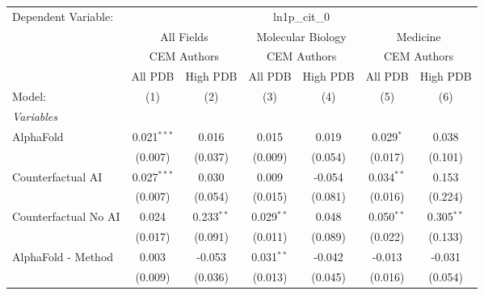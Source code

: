 \begingroup
\centering
\begin{tabular}{lcccccc}
   \tabularnewline \midrule \midrule
   Dependent Variable: & \multicolumn{6}{c}{ln1p\_cit\_0}\\
 & \multicolumn{2}{c}{All Fields} & \multicolumn{2}{c}{Molecular Biology} & \multicolumn{2}{c}{Medicine} \\
\cmidrule(lr){2-3} \cmidrule(lr){4-5} \cmidrule(lr){6-7}
 & \multicolumn{2}{c}{CEM Authors} & \multicolumn{2}{c}{CEM Authors} & \multicolumn{2}{c}{CEM Authors} \\
\cmidrule(lr){2-3} \cmidrule(lr){4-5} \cmidrule(lr){6-7}
 & \multicolumn{1}{c}{All PDB} & \multicolumn{1}{c}{High PDB} & \multicolumn{1}{c}{All PDB} & \multicolumn{1}{c}{High PDB} & \multicolumn{1}{c}{All PDB} & \multicolumn{1}{c}{High PDB} \\
\cmidrule(lr){2-2} \cmidrule(lr){3-3} \cmidrule(lr){4-4} \cmidrule(lr){5-5} \cmidrule(lr){6-6} \cmidrule(lr){7-7}
   Model:                                                     & (1)            & (2)           & (3)            & (4)     & (5)            & (6)\\  
   \midrule
   \emph{Variables}\\
   AlphaFold                                                  & 0.021$^{***}$  & 0.016         & 0.015          & 0.019   & 0.029$^{*}$    & 0.038\\   
                                                              & (0.007)        & (0.037)       & (0.009)        & (0.054) & (0.017)        & (0.101)\\   
   Counterfactual AI                                          & 0.027$^{***}$  & 0.030         & 0.009          & -0.054  & 0.034$^{**}$   & 0.153\\   
                                                              & (0.007)        & (0.054)       & (0.015)        & (0.081) & (0.016)        & (0.224)\\   
   Counterfactual No AI                                       & 0.024          & 0.233$^{**}$  & 0.029$^{**}$   & 0.048   & 0.050$^{**}$   & 0.305$^{**}$\\   
                                                              & (0.017)        & (0.091)       & (0.011)        & (0.089) & (0.022)        & (0.133)\\   
   AlphaFold - Method                                         & 0.003          & -0.053        & 0.031$^{**}$   & -0.042  & -0.013         & -0.031\\   
                                                              & (0.009)        & (0.036)       & (0.013)        & (0.045) & (0.016)        & (0.054)\\   

\end{tabular}
